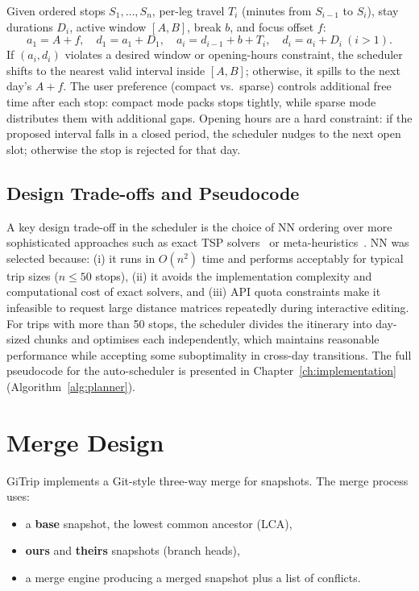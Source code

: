 Given ordered stops $S_1,\dots,S_n$, per-leg travel $T_i$ (minutes from $S_{i-1}$ to $S_i$), stay durations $D_i$, active window $[A,B]$, break $b$, and focus offset $f$:
\[
a_1 = A+f,\quad d_1=a_1+D_1,\quad
a_i = d_{i-1}+b+T_i,\quad d_i=a_i+D_i \ (i>1).
\]
If $(a_i,d_i)$ violates a desired window or opening-hours constraint, the scheduler shifts to the nearest valid interval inside $[A,B]$; otherwise, it spills to the next day's $A+f$. The user preference (compact vs.\ sparse) controls additional free time after each stop: compact mode packs stops tightly, while sparse mode distributes them with additional gaps. Opening hours are a hard constraint: if the proposed interval falls in a closed period, the scheduler nudges to the next open slot; otherwise the stop is rejected for that day.

\subsection{Design Trade-offs and Pseudocode}
A key design trade-off in the scheduler is the choice of NN ordering over more sophisticated approaches such as exact TSP solvers~\cite{ref_tsp_study} or meta-heuristics~\cite{ref_tsp_local_search}. NN was selected because: (i) it runs in $O(n^2)$ time and performs acceptably for typical trip sizes ($n \le 50$ stops), (ii) it avoids the implementation complexity and computational cost of exact solvers, and (iii) API quota constraints make it infeasible to request large distance matrices repeatedly during interactive editing. For trips with more than 50 stops, the scheduler divides the itinerary into day-sized chunks and optimises each independently, which maintains reasonable performance while accepting some suboptimality in cross-day transitions. The full pseudocode for the auto-scheduler is presented in Chapter~\ref{ch:implementation} (Algorithm~\ref{alg:planner}).

\section{Merge Design}
GiTrip implements a Git-style three-way merge for snapshots. The merge process
uses:
\begin{itemize}
  \item a \textbf{base} snapshot, the lowest common ancestor (LCA),
  \item \textbf{ours} and \textbf{theirs} snapshots (branch heads),
  \item a merge engine producing a merged snapshot plus a list of conflicts.
\end{itemize}

